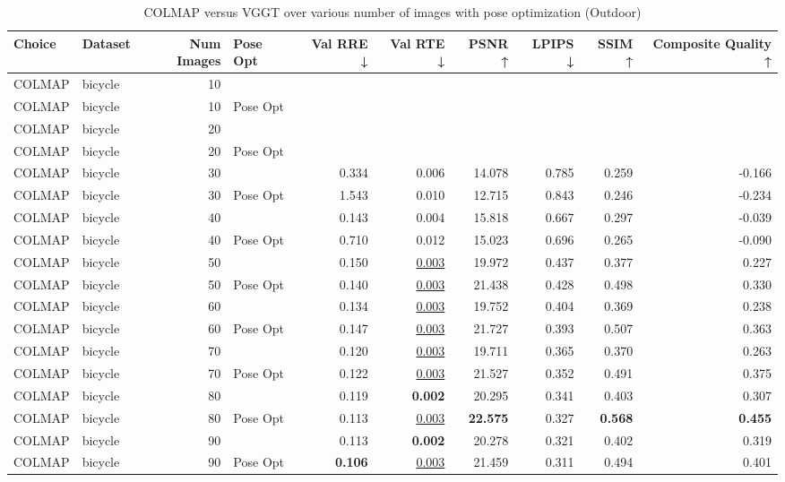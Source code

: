 \begin{table}[H]
\caption{\ifdefined\customcaption \customcaption \else COLMAP versus VGGT over various number of images with pose optimization (Outdoor) \fi}
\label{tab:01_num_images_pose_opt_outdoor}
\centering
\scriptsize
\begin{tabular}{llrlrrrrrr}
\toprule
Choice & Dataset & Num Images & Pose Opt & Val RRE ↓ & Val RTE ↓ & PSNR ↑ & LPIPS ↓ & SSIM ↑ & Composite Quality ↑ \\
\midrule
COLMAP & bicycle & 10 &  &  &  &  &  &  &  \\
COLMAP & bicycle & 10 & Pose Opt &  &  &  &  &  &  \\
COLMAP & bicycle & 20 &  &  &  &  &  &  &  \\
COLMAP & bicycle & 20 & Pose Opt &  &  &  &  &  &  \\
COLMAP & bicycle & 30 &  & 0.334 & 0.006 & 14.078 & 0.785 & 0.259 & -0.166 \\
COLMAP & bicycle & 30 & Pose Opt & 1.543 & 0.010 & 12.715 & 0.843 & 0.246 & -0.234 \\
COLMAP & bicycle & 40 &  & 0.143 & 0.004 & 15.818 & 0.667 & 0.297 & -0.039 \\
COLMAP & bicycle & 40 & Pose Opt & 0.710 & 0.012 & 15.023 & 0.696 & 0.265 & -0.090 \\
COLMAP & bicycle & 50 &  & 0.150 & \underline{0.003} & 19.972 & 0.437 & 0.377 & 0.227 \\
COLMAP & bicycle & 50 & Pose Opt & 0.140 & \underline{0.003} & 21.438 & 0.428 & 0.498 & 0.330 \\
COLMAP & bicycle & 60 &  & 0.134 & \underline{0.003} & 19.752 & 0.404 & 0.369 & 0.238 \\
COLMAP & bicycle & 60 & Pose Opt & 0.147 & \underline{0.003} & 21.727 & 0.393 & 0.507 & 0.363 \\
COLMAP & bicycle & 70 &  & 0.120 & \underline{0.003} & 19.711 & 0.365 & 0.370 & 0.263 \\
COLMAP & bicycle & 70 & Pose Opt & 0.122 & \underline{0.003} & 21.527 & 0.352 & 0.491 & 0.375 \\
COLMAP & bicycle & 80 &  & 0.119 & \textbf{0.002} & 20.295 & 0.341 & 0.403 & 0.307 \\
COLMAP & bicycle & 80 & Pose Opt & 0.113 & \underline{0.003} & \textbf{22.575} & 0.327 & \textbf{0.568} & \textbf{0.455} \\
COLMAP & bicycle & 90 &  & 0.113 & \textbf{0.002} & 20.278 & 0.321 & 0.402 & 0.319 \\
COLMAP & bicycle & 90 & Pose Opt & \textbf{0.106} & \underline{0.003} & 21.459 & 0.311 & 0.494 & 0.401 \\

\end{tabular}
\end{table}
